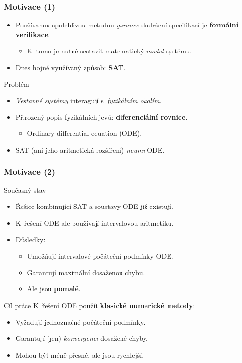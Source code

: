 \documentclass[t]{beamer}
\begin{document}
\begin{frame}\frametitle{Motivace (1)}
\begin{itemize}
\item Používanou spolehlivou metodou \textit{garance}
   dodržení specifikací je \textbf{formální verifikace}.
   \begin{itemize}
   \item K~tomu je nutné sestavit matematický \textit{model} systému.
   \end{itemize}
\item Dnes hojně využívaný způsob: \textbf{SAT}.
\end{itemize}

\begin{alertblock}{Problém}
\begin{itemize}
\item \textit{Vestavné systémy} interagují
   s~\textit{fyzikálním okolím}.
\item Přirozený popis fyzikálních jevů: \textbf{diferenciální rovnice}.
   \begin{itemize}
   \item Ordinary differential equation (ODE).
   \end{itemize}
\item SAT (ani jeho aritmetická rozšíření) \textit{neumí} ODE.
\end{itemize}
\end{alertblock} %
\end{frame}


\begin{frame}\frametitle{Motivace (2)}
\begin{block}{Současný stav}
\begin{itemize}
\item Řešice kombinující SAT a soustavy ODE již existují.
\item K~řešení ODE ale používají intervalovou aritmetiku.
\item Důsledky:
   \begin{itemize}
   \item Umožňují intervalové počáteční podmínky ODE.
   \item Garantují maximální dosaženou chybu.
   \item Ale jsou \textbf{pomalé}.
   \end{itemize}
\end{itemize}
\end{block} %

\vfill

\begin{exampleblock}{Cíl práce}
K~řešení ODE použít \textbf{klasické numerické metody}:
\begin{itemize}
\item Vyžadují jednoznačné počáteční podmínky.
\item Garantují (jen) \textit{konvergenci} dosažené chyby.
\item Mohou být méně přesné, ale jsou rychlejší.
\end{itemize}
\end{exampleblock} %
\end{frame}
\end{document}
